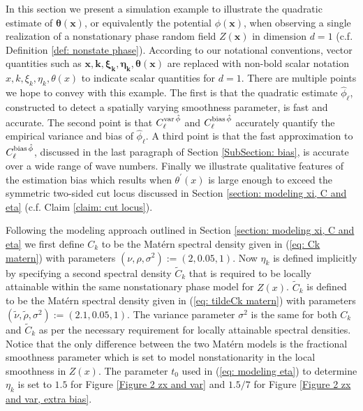 \documentclass[10pt,noinfoline]{imsart}
\newcommand{\bs}{\boldsymbol}
\begin{document}
\label{section: nonstat example d=1}






In this section we present a simulation example to illustrate the quadratic estimate of $\bs \theta(\bs x)$, or equivalently the potential $\phi(\bs x)$, when observing a single realization of a nonstationary phase random field $Z(\bs x)$ in dimension $d=1$ (c.f. Definition \ref{def: nonstate phase}).  According to our notational conventions, vector quantities such as  $\bs x, \bs k, \bs \xi_{\bs k},  \bs\eta_{\bs k}, \bs \theta(\bs x)$ are replaced with non-bold scalar notation $x, k, \xi_{k},  \eta_{k}, \theta(x)$ to indicate scalar quantities for $d=1$. There are multiple points we hope to convey with this example. The first is that the quadratic estimate $\hat\phi_\ell$, constructed to detect a spatially varying smoothness parameter, is fast and accurate. The second point is that $C^{\text{var\,}\hat\phi}_{\ell}$ and $C^{\text{bias\,}\hat\phi}_{\ell}$  accurately quantify the empirical variance and bias of $\hat\phi_\ell$. A third point is that the fast approximation to $C^{\text{bias\,}\hat\phi}_{\ell}$, discussed in the last paragraph of Section \ref{SubSection: bias}, is accurate over a wide range of wave numbers. Finally we illustrate qualitative features of the estimation bias which results when $\theta^\prime(x)$ is large enough to exceed the symmetric two-sided cut locus discussed in Section \ref{section: modeling xi, C and eta} (c.f. Claim \ref{claim: cut locus}).





Following the modeling approach outlined in Section \ref{section: modeling xi, C and eta} we first define $C_k$ to be the  Mat\'ern spectral density given in (\ref{eq: Ck matern}) with parameters $(\nu, \rho, \sigma^2):=(2, 0.05, 1)$. Now  $\eta_k$ is defined implicitly by specifying a second spectral density $\tilde C_k$ that is required to be locally attainable within the same nonstationary phase model for $Z(x)$. $\tilde C_k$ is defined to be the  Mat\'ern spectral density given in (\ref{eq: tildeCk matern})  with parameters $(\tilde \nu, \tilde\rho, \sigma^2):=(2.1, 0.05, 1)$. The variance parameter $\sigma^2$ is the same for both $C_k$ and  $\tilde C_k$ as per the necessary requirement for locally attainable spectral densities. Notice that the only difference between the two Mat\'ern models is the fractional smoothness parameter which is set to model nonstationarity in the local smoothness in $Z(x)$.  The parameter $t_0$ used in (\ref{eq: modeling eta}) to determine $\eta_k$ is set to $1.5$ for Figure \ref{Figure 2 zx and var} and $1.5/7$ for Figure \ref{Figure 2 zx and var, extra bias}. 
\end{document}
